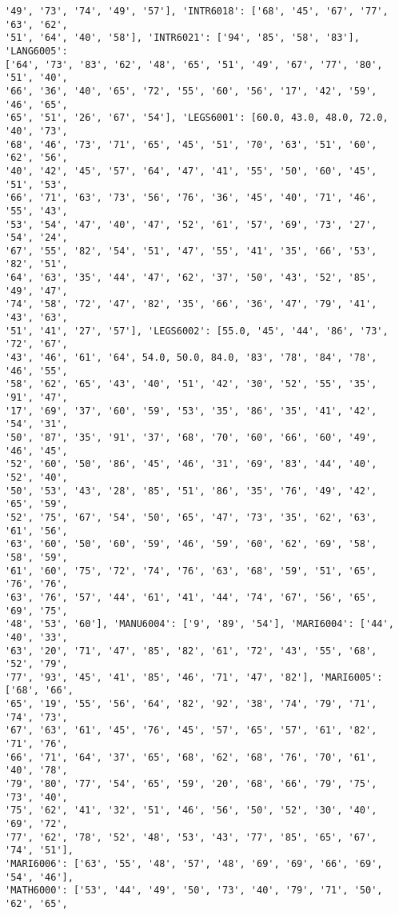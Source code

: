 \documentclass[11pt]{article}
\begin{document}
\begin{Verbatim}[commandchars=\\\{\}]
'49', '73', '74', '49', '57'], 'INTR6018': ['68', '45', '67', '77', '63', '62',
'51', '64', '40', '58'], 'INTR6021': ['94', '85', '58', '83'], 'LANG6005':
['64', '73', '83', '62', '48', '65', '51', '49', '67', '77', '80', '51', '40',
'66', '36', '40', '65', '72', '55', '60', '56', '17', '42', '59', '46', '65',
'65', '51', '26', '67', '54'], 'LEGS6001': [60.0, 43.0, 48.0, 72.0, '40', '73',
'68', '46', '73', '71', '65', '45', '51', '70', '63', '51', '60', '62', '56',
'40', '42', '45', '57', '64', '47', '41', '55', '50', '60', '45', '51', '53',
'66', '71', '63', '73', '56', '76', '36', '45', '40', '71', '46', '55', '43',
'53', '54', '47', '40', '47', '52', '61', '57', '69', '73', '27', '54', '24',
'67', '55', '82', '54', '51', '47', '55', '41', '35', '66', '53', '82', '51',
'64', '63', '35', '44', '47', '62', '37', '50', '43', '52', '85', '49', '47',
'74', '58', '72', '47', '82', '35', '66', '36', '47', '79', '41', '43', '63',
'51', '41', '27', '57'], 'LEGS6002': [55.0, '45', '44', '86', '73', '72', '67',
'43', '46', '61', '64', 54.0, 50.0, 84.0, '83', '78', '84', '78', '46', '55',
'58', '62', '65', '43', '40', '51', '42', '30', '52', '55', '35', '91', '47',
'17', '69', '37', '60', '59', '53', '35', '86', '35', '41', '42', '54', '31',
'50', '87', '35', '91', '37', '68', '70', '60', '66', '60', '49', '46', '45',
'52', '60', '50', '86', '45', '46', '31', '69', '83', '44', '40', '52', '40',
'50', '53', '43', '28', '85', '51', '86', '35', '76', '49', '42', '65', '59',
'52', '75', '67', '54', '50', '65', '47', '73', '35', '62', '63', '61', '56',
'63', '60', '50', '60', '59', '46', '59', '60', '62', '69', '58', '58', '59',
'61', '60', '75', '72', '74', '76', '63', '68', '59', '51', '65', '76', '76',
'63', '76', '57', '44', '61', '41', '44', '74', '67', '56', '65', '69', '75',
'48', '53', '60'], 'MANU6004': ['9', '89', '54'], 'MARI6004': ['44', '40', '33',
'63', '20', '71', '47', '85', '82', '61', '72', '43', '55', '68', '52', '79',
'77', '93', '45', '41', '85', '46', '71', '47', '82'], 'MARI6005': ['68', '66',
'65', '19', '55', '56', '64', '82', '92', '38', '74', '79', '71', '74', '73',
'67', '63', '61', '45', '76', '45', '57', '65', '57', '61', '82', '71', '76',
'66', '71', '64', '37', '65', '68', '62', '68', '76', '70', '61', '40', '78',
'79', '80', '77', '54', '65', '59', '20', '68', '66', '79', '75', '73', '40',
'75', '62', '41', '32', '51', '46', '56', '50', '52', '30', '40', '69', '72',
'77', '62', '78', '52', '48', '53', '43', '77', '85', '65', '67', '74', '51'],
'MARI6006': ['63', '55', '48', '57', '48', '69', '69', '66', '69', '54', '46'],
'MATH6000': ['53', '44', '49', '50', '73', '40', '79', '71', '50', '62', '65',

\end{Verbatim}
\end{document}
